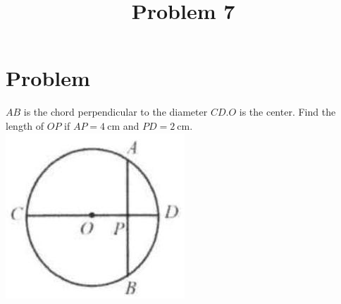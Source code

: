 \documentclass{article}
\title{Problem 7}
\date{}
\begin{document}
\maketitle

\section*{Problem}
\(A B\) is the chord perpendicular to the diameter \(C D . O\) is the center. Find the length of \(O P\) if \(A P=4 \mathrm{~cm}\) and \(P D=2 \mathrm{~cm}\).\\
\centering
\includegraphics[width=\textwidth]{images/problem_image_1.jpg}
\end{document}
